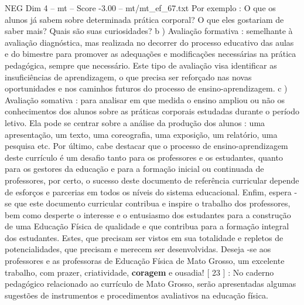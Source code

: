 \begin{textsample}{NEG Dim 4 – mt – Score -3.00 – mt/mt\_ef\_67.txt}
Por exemplo : O que os alunos já sabem sobre determinada prática corporal?
O que eles gostariam de saber mais?
Quais são suas curiosidades? b ) Avaliação formativa : semelhante à avaliação diagnóstica, mas realizada no decorrer do processo educativo das aulas e do bimestre para promover as adequações e modificações necessárias na prática pedagógica, sempre que necessário.
Este tipo de avaliação visa identificar as insuficiências de aprendizagem, o que precisa ser reforçado nas novas oportunidades e nos caminhos futuros do processo de ensino-aprendizagem. c ) Avaliação somativa : para analisar em que medida o ensino ampliou ou não os conhecimentos dos alunos sobre as práticas corporais estudadas durante o período letivo.
Ela pode se centrar sobre a análise da produção dos alunos : uma apresentação, um texto, uma coreografia, uma exposição, um relatório, uma pesquisa etc.
Por último, cabe destacar que o processo de ensino-aprendizagem deste currículo é um desafio tanto para os professores e os estudantes, quanto para os gestores da educação e para a formação inicial ou continuada de professores, por certo, o sucesso deste documento de referência curricular depende de esforços e parcerias em todos os níveis do sistema educacional.
Enfim, espera -se que este documento curricular contribua e inspire o trabalho dos professores, bem como desperte o interesse e o entusiasmo dos estudantes para a construção de uma Educação Física de qualidade e que contribua para a formação integral dos estudantes.
Estes, que precisam ser vistos em sua totalidade e repletos de potencialidades, que precisam e merecem ser desenvolvidas.
Deseja -se aos professores e as professoras de Educação Física de Mato Grosso, um excelente trabalho, com prazer, criatividade, \textbf{coragem} e ousadia! [ 23 ] : No caderno pedagógico relacionado ao currículo de Mato Grosso, serão apresentadas algumas sugestões de instrumentos e procedimentos avaliativos na educação física.

\end{textsample}
